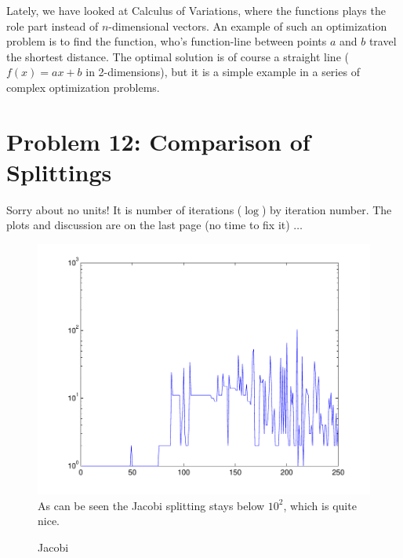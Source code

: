 \documentclass[10pt,oneside,a4paper,final,english]{memoir}
\begin{document}
Lately, we have looked at Calculus of Variations, where the functions
plays the role part instead of $n$-dimensional vectors. An example of
such an optimization problem is to find the function, who's
function-line between points $a$ and $b$ travel the shortest
distance. The optimal solution is of course a straight line ($f(x) =
ax+b$ in 2-dimensions), but it is a simple example in a series of
complex optimization problems.


\section{Problem 12: Comparison of Splittings}

Sorry about no units! It is number of iterations ($\log$) by iteration
number. The plots and discussion are on the last page (no time to fix
it) $\ldots$

\begin{figure}[h!]
\caption{Jacobi}
\includegraphics[width=\textwidth]{images/jacobi.pdf}\\
As can be seen the Jacobi splitting stays below $10^2$, which is quite
nice.
\end{figure}
\end{document}
